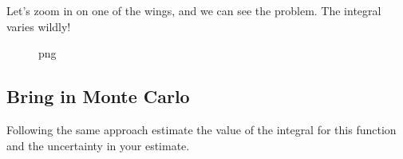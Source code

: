 Let's zoom in on one of the wings, and we can see the problem. The
integral varies wildly!

\begin{Shaded}
\begin{Highlighting}[]
\OperatorTok{=}\NormalTok{,}\NormalTok{,}\NormalTok{)}
\OperatorTok{=}\OperatorTok{/}\OperatorTok{*}\NormalTok{(}\OperatorTok{{-}}\OperatorTok{**}

\OperatorTok{=}\NormalTok{(}\NormalTok{,}\NormalTok{))}
\NormalTok{plt.axis([}\NormalTok{, }\NormalTok{, }\NormalTok{, }\NormalTok{])}
\end{Highlighting}
\end{Shaded}

\begin{figure}
\centering
{}
\caption{png}
\end{figure}

\subsection{Bring in Monte Carlo}\label{bring-in-monte-carlo}

Following the same approach estimate the value of the integral for this
function and the uncertainty in your estimate.

\begin{Shaded}
\begin{Highlighting}[]
\end{Highlighting}
\end{Shaded}
